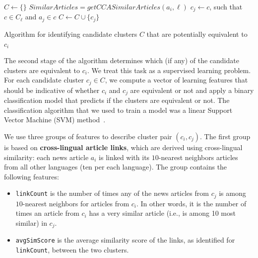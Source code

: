 \begin{algorithm}[t!]
$C \leftarrow \{\}$\;
 {
     {
        $SimilarArticles = getCCASimilarArticles(a_i, \ell)$\;
         {
            $c_j \leftarrow c$, such that $c \in C_\ell$ and $a_j \in c$\;
            $C \leftarrow C \cup \{ c_j \}$\;
        }
    }
}
\caption{Algorithm for identifying candidate clusters $C$ that are potentially equivalent to $c_i$}
\label{cluster_merge_algo1}
\end{algorithm}

The second stage of the algorithm determines which (if any) of the candidate clusters are equivalent to $c_i$. 
We treat this task as a supervised learning problem. For each candidate cluster $c_j \in C$, we compute 
a vector of learning features that should be indicative of whether $c_i$ and $c_j$ are equivalent or not 
and apply a binary classification model that predicts if the clusters are equivalent or not. The classification 
algorithm that we used to train a model was a linear Support Vector Machine (SVM) method~\cite{shawe-taylor04kernel}.

We use three groups of features to describe cluster pair $(c_i, c_j)$. The first group is based 
on {\bf cross-lingual article links}, which are derived using cross-lingual similarity: 
each news article $a_i$ is linked with its $10$-nearest neighbors articles from all other 
languages (ten per each language). The group contains the following features:

\begin{itemize}
\item \texttt{linkCount} is the number of times any of the news articles from $c_j$ is among $10$-nearest neighbors for articles from $c_i$. In other words, it is the number of times an article from $c_i$ has a very similar article (i.e., is among 10 most similar) in $c_j$.
\item \texttt{avgSimScore} is the average similarity score of the links, as identified for \texttt{linkCount}, between the two clusters.
\end{itemize}

